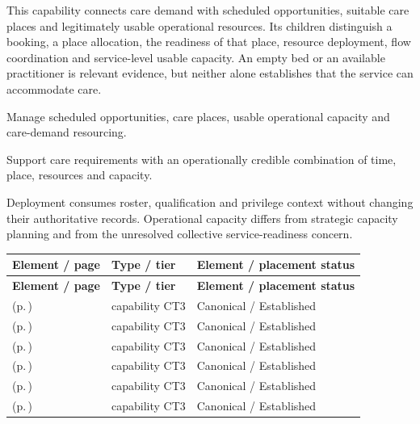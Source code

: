 This capability connects care demand with scheduled opportunities, suitable care places and legitimately usable operational resources. Its children distinguish a booking, a place allocation, the readiness of that place, resource deployment, flow coordination and service-level usable capacity. An empty bed or an available practitioner is relevant evidence, but neither alone establishes that the service can accommodate care.



Manage scheduled opportunities, care places, usable operational capacity and care-demand resourcing.



Support care requirements with an operationally credible combination of time, place, resources and capacity.



Deployment consumes roster, qualification and privilege context without changing their authoritative records. Operational capacity differs from strategic capacity planning and from the unresolved collective service-readiness concern.


\begingroup\small\setlength{\TableWidth}{\dimexpr\linewidth-6\tabcolsep-4\arrayrulewidth\relax}
\begin{longtable}{|>{\raggedright\arraybackslash}p{0.52\TableWidth}|>{\raggedright\arraybackslash}p{0.2\TableWidth}|>{\raggedright\arraybackslash}p{0.28\TableWidth}|}
\hline\rowcolor{TableHead}\textbf{Element / page} & \textbf{Type / tier} & \textbf{Element / placement status}\\\hline\endfirsthead
\hline\rowcolor{TableHead}\textbf{Element / page} & \textbf{Type / tier} & \textbf{Element / placement status}\\\hline\endhead
\hline\endfoot
\nameref{cap:bc-care-appointment-management} (p.\,\pageref{cap:bc-care-appointment-management}) & capability CT3 & Canonical / Established\\\hline
\nameref{cap:bc-care-place-allocation} (p.\,\pageref{cap:bc-care-place-allocation}) & capability CT3 & Canonical / Established\\\hline
\nameref{cap:bc-care-place-readiness-management} (p.\,\pageref{cap:bc-care-place-readiness-management}) & capability CT3 & Canonical / Established\\\hline
\nameref{cap:bc-care-resource-deployment} (p.\,\pageref{cap:bc-care-resource-deployment}) & capability CT3 & Canonical / Established\\\hline
\nameref{cap:bc-operational-care-flow-coordination} (p.\,\pageref{cap:bc-operational-care-flow-coordination}) & capability CT3 & Canonical / Established\\\hline
\nameref{cap:bc-operational-care-capacity-management} (p.\,\pageref{cap:bc-operational-care-capacity-management}) & capability CT3 & Canonical / Established\\\hline
\end{longtable}\endgroup

